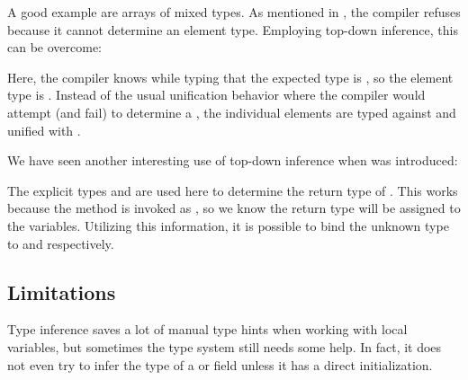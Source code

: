 A good example are arrays of mixed types. As mentioned in , the compiler refuses \expr{[1, "foo"]} because it cannot determine an element type. Employing top-down inference, this can be overcome:


Here, the compiler knows while typing \expr{[1, "foo"]} that the expected type is , so the element type is . Instead of the usual unification behavior where the compiler would attempt (and fail) to determine a , the individual elements are typed against and unified with .

We have seen another interesting use of top-down inference when  was introduced:


The explicit types  and  are used here to determine the return type of . This works because the method is invoked as , so we know the return type will be assigned to the variables. Utilizing this information, it is possible to bind the unknown type  to  and  respectively.





\subsection{Limitations}
\label{type-system-inference-limitations}

Type inference saves a lot of manual type hints when working with local variables, but sometimes the type system still needs some help. In fact, it does not even try to infer the type of a  or  field unless it has a direct initialization.

